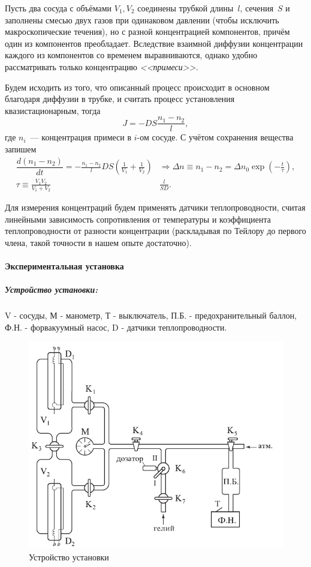 \documentclass[12pt]{article}
\begin{document}
		Пусть два сосуда с объёмами $V_1, V_2$ соединены трубкой длины~$l$, сечения~$S$
		и заполнены смесью двух газов при одинаковом давлении (чтобы исключить
		макроскопические течения), но с разной концентрацией компонентов, причём один
		из компонентов преобладает.
		Вследствие взаимной диффузии концентрации каждого из компонентов со временем
		выравниваются, однако удобно рассматривать только концентрацию
		\emph{<<примеси>>.}
		
		Будем исходить из того, что описанный процесс происходит в основном благодаря
		диффузии в трубке, и считать процесс установления квазистационарным, тогда
		\begin{equation}
		J = -DS \frac{n_1 - n_2}{l},
		\end{equation}
		где $n_i$~--- концентрация примеси в $i$-ом сосуде. С учётом сохранения
		вещества запишем
		\begin{align}
		\dfrac{d(n_1 - n_2)}{dt} = -\frac{n_1 - n_2}{l} DS \left(\frac{1}{V_1} +
		\frac{1}{V_2}\right)
		&\Rightarrow
		\Delta n \equiv n_1 - n_2 = \Delta n_0 \exp\left(-\frac{t}{\tau}\right),
		\\		
		\tau \equiv \frac{V_1 V_2}{V_1 + V_2}& \frac{l}{SD}.
		\end{align}
		
		Для измерения концентраций будем применять датчики теплопроводности, считая
		линейными зависимость сопротивления от температуры и коэффициента
		теплопроводности от разности концентрации (раскладывая по Тейлору до первого члена, такой точности в нашем опыте достаточно).
		
		\paragraph{Экспериментальная установка}
		\subparagraph{Устройство установки:}V - сосуды, М - манометр, Т - выключатель, П.Б. - предохранительный баллон, Ф.Н. - форвакуумный насос, D - датчики теплопроводности.
		\begin{figure}[h]
				\includegraphics{1}
				\caption{Устройство установки}
		\end{figure}
		
\end{document}
